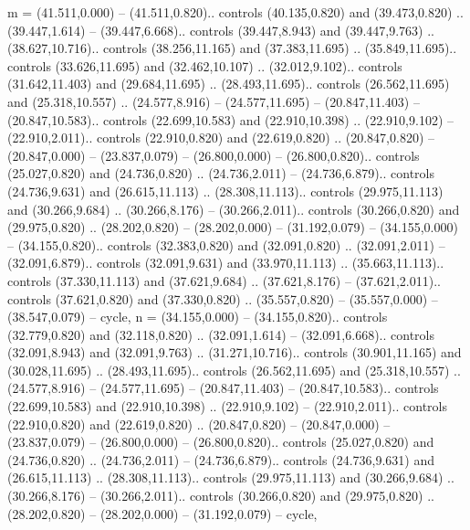 {m} = {(41.511,0.000) -- (41.511,0.820).. controls (40.135,0.820) and (39.473,0.820) .. (39.447,1.614) -- (39.447,6.668).. controls (39.447,8.943) and (39.447,9.763) .. (38.627,10.716).. controls (38.256,11.165) and (37.383,11.695) .. (35.849,11.695).. controls (33.626,11.695) and (32.462,10.107) .. (32.012,9.102).. controls (31.642,11.403) and (29.684,11.695) .. (28.493,11.695).. controls (26.562,11.695) and (25.318,10.557) .. (24.577,8.916) -- (24.577,11.695) -- (20.847,11.403) -- (20.847,10.583).. controls (22.699,10.583) and (22.910,10.398) .. (22.910,9.102) -- (22.910,2.011).. controls (22.910,0.820) and (22.619,0.820) .. (20.847,0.820) -- (20.847,0.000) -- (23.837,0.079) -- (26.800,0.000) -- (26.800,0.820).. controls (25.027,0.820) and (24.736,0.820) .. (24.736,2.011) -- (24.736,6.879).. controls (24.736,9.631) and (26.615,11.113) .. (28.308,11.113).. controls (29.975,11.113) and (30.266,9.684) .. (30.266,8.176) -- (30.266,2.011).. controls (30.266,0.820) and (29.975,0.820) .. (28.202,0.820) -- (28.202,0.000) -- (31.192,0.079) -- (34.155,0.000) -- (34.155,0.820).. controls (32.383,0.820) and (32.091,0.820) .. (32.091,2.011) -- (32.091,6.879).. controls (32.091,9.631) and (33.970,11.113) .. (35.663,11.113).. controls (37.330,11.113) and (37.621,9.684) .. (37.621,8.176) -- (37.621,2.011).. controls (37.621,0.820) and (37.330,0.820) .. (35.557,0.820) -- (35.557,0.000) -- (38.547,0.079) -- cycle},
{n} = {(34.155,0.000) -- (34.155,0.820).. controls (32.779,0.820) and (32.118,0.820) .. (32.091,1.614) -- (32.091,6.668).. controls (32.091,8.943) and (32.091,9.763) .. (31.271,10.716).. controls (30.901,11.165) and (30.028,11.695) .. (28.493,11.695).. controls (26.562,11.695) and (25.318,10.557) .. (24.577,8.916) -- (24.577,11.695) -- (20.847,11.403) -- (20.847,10.583).. controls (22.699,10.583) and (22.910,10.398) .. (22.910,9.102) -- (22.910,2.011).. controls (22.910,0.820) and (22.619,0.820) .. (20.847,0.820) -- (20.847,0.000) -- (23.837,0.079) -- (26.800,0.000) -- (26.800,0.820).. controls (25.027,0.820) and (24.736,0.820) .. (24.736,2.011) -- (24.736,6.879).. controls (24.736,9.631) and (26.615,11.113) .. (28.308,11.113).. controls (29.975,11.113) and (30.266,9.684) .. (30.266,8.176) -- (30.266,2.011).. controls (30.266,0.820) and (29.975,0.820) .. (28.202,0.820) -- (28.202,0.000) -- (31.192,0.079) -- cycle},
